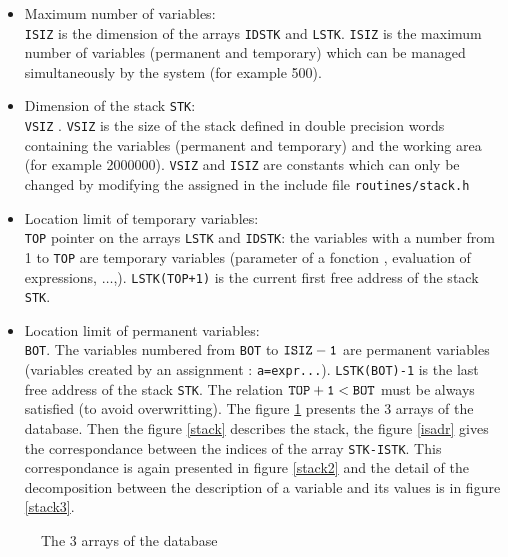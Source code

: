 \begin{itemize}

\item Maximum number of variables: \\
{\tt  ISIZ}  is the dimension of the 
arrays  \verb!IDSTK!  and
\verb!LSTK!.  \verb!ISIZ!  is the maximum number of variables
(permanent and  temporary) which can be managed simultaneously
by the system (for example 500).

\item Dimension of the stack \verb!STK!:  \\
{\tt VSIZ} .  \verb!VSIZ!
is the size of the stack defined in double precision words 
containing the variables (permanent and temporary) and the working 
area (for example 2000000).  {\tt VSIZ} and
{\tt ISIZ} are constants which can only be changed by
modifying the assigned in the include file
 \verb!routines/stack.h!

\item Location limit of temporary variables: \\
{\tt  TOP}  pointer  on the arrays 
\verb!LSTK!   and
\verb!IDSTK!: the variables with a  number from  1 to \verb!TOP!  are
temporary variables   (parameter of a  fonction ,
evaluation of expressions, $\ldots$,).  \verb!LSTK(TOP+1)!
is the current first free address of the stack \verb!STK!.

\item Location limit of permanent variables: \\
{\tt  BOT}.  The  variables numbered from  \verb!BOT!  to  ${\tt
ISIZ-1}$ are  permanent variables   (variables created by an
assignment : \verb!a=expr...!).   \verb!LSTK(BOT)-1! is the last free
address of the stack \verb!STK!.    The relation ${\tt TOP+1}<{\tt
BOT}$ must be always satisfied (to avoid overwritting).  
The figure \ref{database} presents the 3 arrays of the database.
Then the figure  \ref{stack} describes the stack, the figure \ref{isadr} gives
the correspondance between the indices of the array {\tt STK-ISTK}.
This correspondance is again presented in figure \ref{stack2} and the detail
of the decomposition between the description of a variable and its values
is in figure \ref{stack3}.

\end{itemize}

\begin{figure}
\hspace{-1.cm}
\caption{The 3 arrays of the database}
\label{database}
\end{figure}



